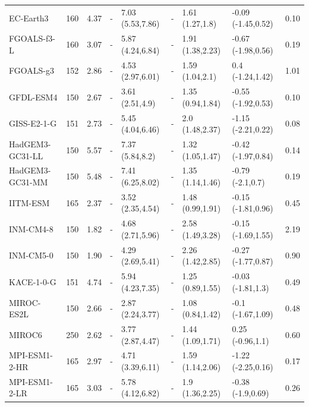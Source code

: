 \documentclass[esd, article]{copernicus}
\begin{document}
\begin{table}[t]
\begin{tabular}{llrrlrllr}
       EC-Earth3 &   160 &       4.37 &         - &  7.03 (5.53,7.86) &       - &   1.61 (1.27,1.8) &  -0.09 (-1.45,0.52) &         0.10 \\
     FGOALS-f3-L &   160 &       3.07 &         - &  5.87 (4.24,6.84) &       - &  1.91 (1.38,2.23) &  -0.67 (-1.98,0.56) &         0.19 \\
       FGOALS-g3 &   152 &       2.86 &         - &  4.53 (2.97,6.01) &       - &   1.59 (1.04,2.1) &    0.4 (-1.24,1.42) &         1.01 \\
       GFDL-ESM4 &   150 &       2.67 &         - &   3.61 (2.51,4.9) &       - &  1.35 (0.94,1.84) &  -0.55 (-1.92,0.53) &         0.10 \\
     GISS-E2-1-G &   151 &       2.73 &         - &  5.45 (4.04,6.46) &       - &   2.0 (1.48,2.37) &  -1.15 (-2.21,0.22) &         0.08 \\
 HadGEM3-GC31-LL &   150 &       5.57 &         - &   7.37 (5.84,8.2) &       - &  1.32 (1.05,1.47) &  -0.42 (-1.97,0.84) &         0.14 \\
 HadGEM3-GC31-MM &   150 &       5.48 &         - &  7.41 (6.25,8.02) &       - &  1.35 (1.14,1.46) &    -0.79 (-2.1,0.7) &         0.19 \\
        IITM-ESM &   165 &       2.37 &         - &  3.52 (2.35,4.54) &       - &  1.48 (0.99,1.91) &  -0.15 (-1.81,0.96) &         0.45 \\
       INM-CM4-8 &   150 &       1.82 &         - &  4.68 (2.71,5.96) &       - &  2.58 (1.49,3.28) &  -0.15 (-1.69,1.55) &         2.19 \\
       INM-CM5-0 &   150 &       1.90 &         - &  4.29 (2.69,5.41) &       - &  2.26 (1.42,2.85) &  -0.27 (-1.77,0.87) &         0.90 \\
      KACE-1-0-G &   151 &       4.74 &         - &  5.94 (4.23,7.35) &       - &  1.25 (0.89,1.55) &   -0.03 (-1.81,1.3) &         0.49 \\
      MIROC-ES2L &   150 &       2.66 &         - &  2.87 (2.24,3.77) &       - &  1.08 (0.84,1.42) &   -0.1 (-1.67,1.09) &         0.48 \\
          MIROC6 &   250 &       2.62 &         - &  3.77 (2.87,4.47) &       - &  1.44 (1.09,1.71) &    0.25 (-0.96,1.1) &         0.60 \\
   MPI-ESM1-2-HR &   165 &       2.97 &         - &  4.71 (3.39,6.11) &       - &  1.59 (1.14,2.06) &  -1.22 (-2.25,0.16) &         0.17 \\
   MPI-ESM1-2-LR &   165 &       3.03 &         - &  5.78 (4.12,6.82) &       - &   1.9 (1.36,2.25) &   -0.38 (-1.9,0.69) &         0.26 \\

\end{tabular}
\end{table}
\end{document}
